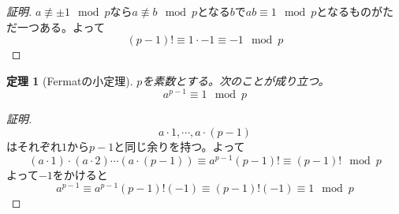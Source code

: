\documentclass{ltjsarticle}
\newtheorem{theorem}{定理}[section]
\begin{document}
\begin{proof}[証明]
$a\not\equiv \pm1\mod{p}$なら$a\not\equiv b\mod{p}$となる$b$で$ab\equiv1\mod{p}$となるものがただ一つある。よって
\begin{equation*}
(p-1)!\equiv 1\cdot -1\equiv -1\mod{p}
\end{equation*}
\end{proof}
\begin{theorem}[Fermatの小定理]
$p$を素数とする。次のことが成り立つ。
\begin{equation*}
a^{p-1}\equiv 1\mod{p}
\end{equation*}
\end{theorem}
\begin{proof}[証明]
\begin{equation*}
a\cdot1,\cdots,a\cdot(p-1)
\end{equation*}
はそれぞれ$1$から$p-1$と同じ余りを持つ。よって
\begin{equation*}
(a\cdot 1)\cdot(a\cdot 2)\cdots(a\cdot(p-1)) \equiv a^{p-1}(p-1)! \equiv (p-1)!\mod{p}
\end{equation*}
よって$-1$をかけると
\begin{equation*}
a^{p-1}\equiv a^{p-1}(p-1)!(-1) \equiv (p-1)!(-1)\equiv 1\mod{p}
\end{equation*}
\end{proof}
\end{document}
